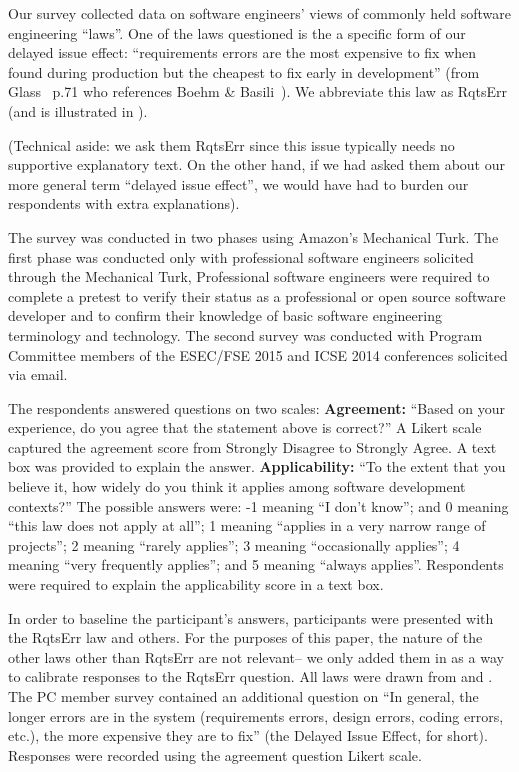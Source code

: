 




Our survey collected data on software engineers' views of commonly held software engineering ``laws''.
One of the laws questioned is the a specific form of our delayed issue effect:  ``requirements errors are the most expensive to fix when found during production but the cheapest to fix early in development'' (from Glass~\cite{glass02} p.71 who references Boehm \& Basili~\cite{boehm01}). We abbreviate this law as RqtsErr
(and is
illustrated in ).

(Technical aside: we ask them  RqtsErr  since this issue typically needs no supportive explanatory
text. On the other hand, if we had asked them about our more general term ``delayed issue
effect'', we would have had to burden our respondents with extra explanations).

The survey was conducted in two phases using Amazon's Mechanical Turk. The first phase was conducted only with professional software engineers solicited through the Mechanical Turk,
Professional software engineers were required to complete a pretest to verify their status as a professional or open source software developer and to confirm their knowledge of basic software engineering terminology and technology. The  second survey was conducted with Program Committee members of the ESEC/FSE 2015 and ICSE 2014  conferences solicited via email.

The respondents answered questions on two scales: \newline
\textbf{Agreement:} ``Based on your experience, do you agree that the statement above is correct?'' A Likert scale captured the agreement score from Strongly Disagree to Strongly Agree. A text box was provided to explain the answer. \newline
\textbf{Applicability:} ``To the extent that you believe it, how widely do you think it applies among software development contexts?'' The possible answers were: 
-1 meaning ``I don't know''; and 0 meaning ``this law does not apply at all'';
 1 meaning ``applies in a very narrow range of projects'';  2 meaning
``rarely applies'';   3 meaning
``occasionally applies'';  
4 meaning ``very frequently applies''; and
 5 meaning ``always applies''.
Respondents were required to explain the applicability score in a text box.

In order to baseline the participant's answers, participants were presented with the RqtsErr law and others. For the purposes
of this paper, the nature of the other laws other than RqtsErr are not relevant-- we
only added them in as a way to calibrate responses to the RqtsErr question. All laws were drawn from \cite{glass02} and \cite{endres03}. 
The PC member survey contained an additional question on ``In general, the longer errors are in the system (requirements errors, design errors, coding errors, etc.), the more expensive they are to fix'' (the Delayed Issue Effect, for short). Responses were recorded using the agreement question Likert scale. 

